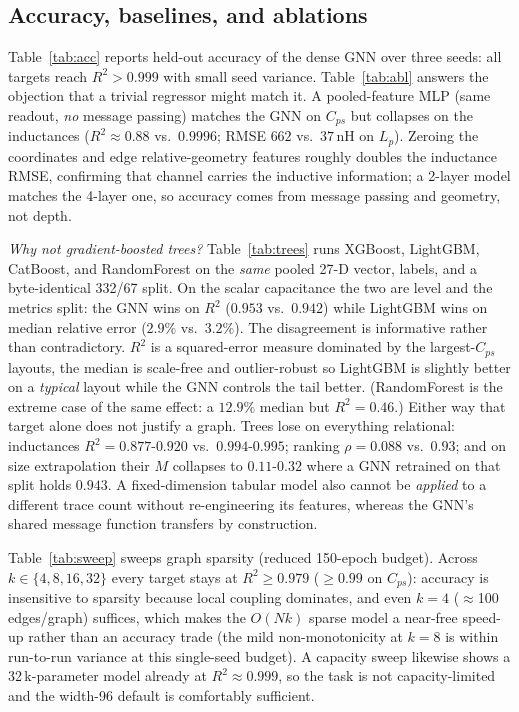 \documentclass[letterpaper,twocolumn,9pt]{extarticle}
\begin{document}
\subsection{Accuracy, baselines, and ablations}
Table~\ref{tab:acc} reports held-out accuracy of the dense GNN over three seeds:
all targets reach $R^2>0.999$ with small seed variance. Table~\ref{tab:abl}
answers the objection that a trivial regressor might match it. A pooled-feature
MLP (same readout, \emph{no} message passing) matches the GNN on $C_{ps}$ but
collapses on the inductances ($R^2\!\approx\!0.88$ vs.\ $0.9996$; RMSE $662$ vs.\
$37$\,nH on $L_p$). Zeroing the coordinates and edge relative-geometry features
roughly doubles the inductance RMSE, confirming that channel carries the inductive
information; a 2-layer model matches the 4-layer one, so accuracy comes from
message passing and geometry, not depth.

\emph{Why not gradient-boosted trees?} Table~\ref{tab:trees} runs XGBoost,
LightGBM, CatBoost, and RandomForest on the \emph{same} pooled 27-D vector,
labels, and a byte-identical 332/67 split. On the scalar capacitance the two are
level and the metrics split: the GNN wins on $R^2$ ($0.953$ vs.\ $0.942$) while
LightGBM wins on median relative error ($2.9\%$ vs.\ $3.2\%$). The disagreement is
informative rather than contradictory. $R^2$ is a squared-error measure dominated
by the largest-$C_{ps}$ layouts, the median is scale-free and outlier-robust so
LightGBM is slightly better on a \emph{typical} layout while the GNN controls the
tail better. (RandomForest is the extreme case of the same effect: a $12.9\%$
median but $R^2=0.46$.) Either way that target alone does not justify a graph.
Trees lose on
everything relational: inductances $R^2=0.877$-$0.920$ vs.\ $0.994$-$0.995$;
ranking $\rho=0.088$ vs.\ $0.93$; and on size extrapolation their $M$ collapses to
$0.11$-$0.32$ where a GNN retrained on that split holds $0.943$. A fixed-dimension
tabular model also cannot be \emph{applied} to a different trace count without
re-engineering its features, whereas the GNN's shared message function transfers
by construction.

Table~\ref{tab:sweep} sweeps graph sparsity (reduced 150-epoch budget). Across
$k\in\{4,8,16,32\}$ every target stays at $R^2\ge0.979$ ($\ge0.99$ on $C_{ps}$):
accuracy is insensitive to sparsity because local coupling dominates, and even
$k=4$ ($\approx$100 edges/graph) suffices, which makes the $O(Nk)$ sparse model a
near-free speed-up rather than an accuracy trade (the mild non-monotonicity at
$k=8$ is within run-to-run variance at this single-seed budget). A capacity sweep
likewise shows a 32\,k-parameter model already at $R^2\approx0.999$, so the task
is not capacity-limited and the width-96 default is comfortably sufficient.
\end{document}
